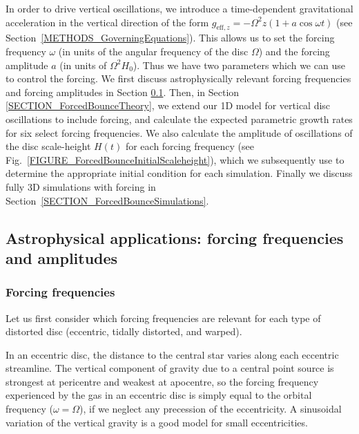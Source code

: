 \documentclass[fleqn,usenatbib]{mnras}
\begin{document}
In order to drive vertical oscillations, we introduce a time-dependent gravitational acceleration in the vertical direction of the form $g_{\text{eff},z} = -\Omega^2 z (1+a\cos{\omega t})$ (see Section~\ref{METHODS_GoverningEquations}). This allows us to set the forcing frequency $\omega$ (in units of the angular frequency of the disc $\Omega$) and the forcing amplitude $a$ (in units of $\Omega^2 H_0$). Thus we have two parameters which we can use to control the forcing. We first discuss astrophysically relevant forcing frequencies and forcing amplitudes in Section \ref{SECTION_ForcedBounceAstrophysicalApplications}. Then, in Section \ref{SECTION_ForcedBounceTheory}, we extend our 1D model for vertical disc oscillations to include forcing, and calculate the expected parametric growth rates for six select forcing frequencies. We also calculate the amplitude of oscillations of the disc scale-height $H(t)$ for each forcing frequency (see Fig.~\ref{FIGURE_ForcedBounceInitialScaleheight}), which we subsequently use to determine the appropriate initial condition for each simulation. Finally we discuss fully 3D simulations with forcing in Section~\ref{SECTION_ForcedBounceSimulations}.

\subsection{Astrophysical applications: forcing frequencies and amplitudes}
\label{SECTION_ForcedBounceAstrophysicalApplications}
\subsubsection{Forcing frequencies}
Let us first consider which forcing frequencies are relevant for each type of distorted disc (eccentric, tidally distorted, and warped). 

In an eccentric disc, the distance to the central star varies along each eccentric streamline. The vertical component of gravity due to a central point source is strongest at pericentre and weakest at apocentre, so the forcing frequency experienced by the gas in an eccentric disc %
is simply equal to the orbital frequency ($\omega = \Omega$), if we neglect any precession of the eccentricity. A sinusoidal variation of the vertical gravity is a good model for small eccentricities.
\end{document}

